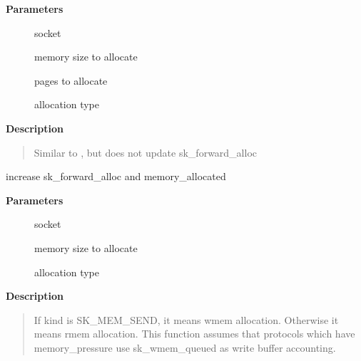 \documentclass[a4paper,8pt,english]{sphinxmanual}
\begin{document}
\textbf{Parameters}
\begin{description}
\item[{}] \leavevmode
socket

\item[{}] \leavevmode
memory size to allocate

\item[{}] \leavevmode
pages to allocate

\item[{}] \leavevmode
allocation type

\end{description}

\textbf{Description}
\begin{quote}

Similar to {\hyperref[networking/kapi:c.__sk_mem_schedule]{\emph{}}}, but does not update sk\_forward\_alloc
\end{quote}

\begin{fulllineitems}
\label{networking/kapi:c.__sk_mem_schedule}
increase sk\_forward\_alloc and memory\_allocated

\end{fulllineitems}


\textbf{Parameters}
\begin{description}
\item[{}] \leavevmode
socket

\item[{}] \leavevmode
memory size to allocate

\item[{}] \leavevmode
allocation type

\end{description}

\textbf{Description}
\begin{quote}

If kind is SK\_MEM\_SEND, it means wmem allocation. Otherwise it means
rmem allocation. This function assumes that protocols which have
memory\_pressure use sk\_wmem\_queued as write buffer accounting.
\end{quote}
\end{document}

